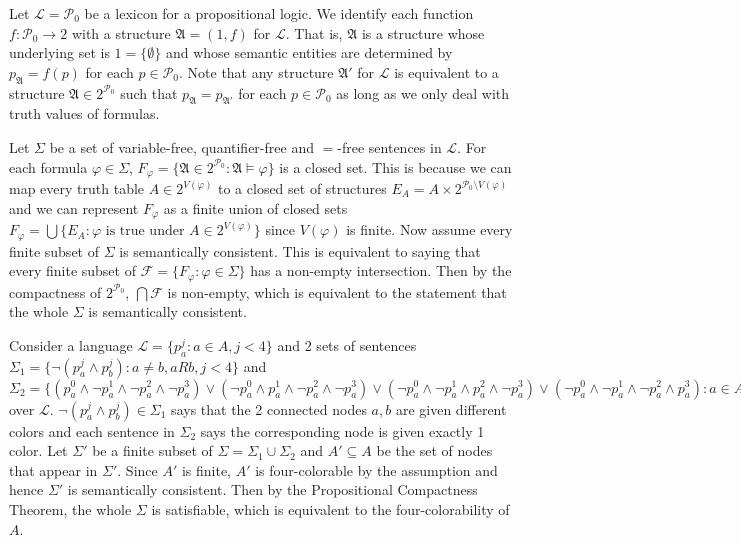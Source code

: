 \documentclass[12pt]{article}
\theoremstyle{definition}
\newenvironment{customthm}[1]
  {\renewcommand\theinnercustomthm{#1}\innercustomthm}
  {\endinnercustomthm}
\begin{document}
\begin{customthm}{II.7.18} Let $\mathcal{L}=\mathcal{P}_0$ be a lexicon for a propositional logic. We identify each function $f:\mathcal{P}_0\rightarrow2$ with a structure $\mathfrak{A}=(1,f)$ for $\mathcal{L}$. That is, $\mathfrak{A}$ is a structure whose underlying set is $1=\{\emptyset\}$ and whose semantic entities are determined by $p_\mathfrak{A}=f(p)$ for each $p\in\mathcal{P}_0$. Note that any structure $\mathfrak{A}'$ for $\mathcal{L}$ is equivalent to a structure $\mathfrak{A}\in2^{\mathcal{P}_0}$ such that $p_\mathfrak{A}=p_{\mathfrak{A}'}$ for each $p\in\mathcal{P}_0$ as long as we only deal with truth values of formulas.

Let $\Sigma$ be a set of variable-free, quantifier-free and $=$-free sentences in $\mathcal{L}$. For each formula $\varphi\in\Sigma$, $F_\varphi=\{\mathfrak{A}\in2^{\mathcal{P}_0}:\mathfrak{A}\models\varphi\}$ is a closed set. This is because we can map every truth table $A\in2^{V(\varphi)}$ to a closed set of structures $E_A=A\times2^{\mathcal{P}_0\setminus V(\varphi)}$ and we can represent $F_\varphi$ as a finite union of closed sets $F_\varphi=\bigcup\{E_A:\varphi\text{ is true under }A\in2^{V(\varphi)}\}$ since $V(\varphi)$ is finite. Now assume every finite subset of $\Sigma$ is semantically consistent. This is equivalent to saying that every finite subset of $\mathcal{F}=\{F_\varphi:\varphi\in\Sigma\}$ has a non-empty intersection. Then by the compactness of $2^{\mathcal{P}_0}$, $\bigcap\mathcal{F}$ is non-empty, which is equivalent to the statement that the whole $\Sigma$ is semantically consistent.
\end{customthm}

\begin{customthm}{II.7.19} Consider a language $\mathcal{L}=\{p_a^j:a\in A,j<4\}$ and 2 sets of sentences $\Sigma_1=\{\neg(p_a^j\wedge p_b^j):a\neq b,aRb,j<4\}$ and $\Sigma_2=\{(p_a^0\wedge\neg p_a^1\wedge\neg p_a^2\wedge\neg p_a^3)\vee(\neg p_a^0\wedge p_a^1\wedge\neg p_a^2\wedge\neg p_a^3)\vee(\neg p_a^0\wedge\neg p_a^1\wedge p_a^2\wedge\neg p_a^3)\vee(\neg p_a^0\wedge\neg p_a^1\wedge\neg p_a^2\wedge p_a^3):a\in A\}$ over $\mathcal{L}$. $\neg(p_a^j\wedge p_b^j)\in\Sigma_1$ says that the 2 connected nodes $a,b$ are given different colors and each sentence in $\Sigma_2$ says the corresponding node is given exactly 1 color. Let $\Sigma'$ be a finite subset of $\Sigma=\Sigma_1\cup\Sigma_2$ and $A'\subseteq A$ be the set of nodes that appear in $\Sigma'$. Since $A'$ is finite, $A'$ is four-colorable by the assumption and hence $\Sigma'$ is semantically consistent. Then by the Propositional Compactness Theorem, the whole $\Sigma$ is satisfiable, which is equivalent to the four-colorability of $A$.
\end{customthm}
\end{document}
